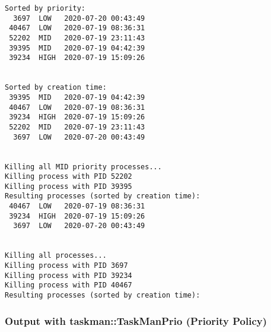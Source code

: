 \documentclass[a4paper]{scrartcl}
\begin{document}
\begin{verbatim}
Sorted by priority:
  3697  LOW   2020-07-20 00:43:49
 40467  LOW   2020-07-19 08:36:31
 52202  MID   2020-07-19 23:11:43
 39395  MID   2020-07-19 04:42:39
 39234  HIGH  2020-07-19 15:09:26


Sorted by creation time:
 39395  MID   2020-07-19 04:42:39
 40467  LOW   2020-07-19 08:36:31
 39234  HIGH  2020-07-19 15:09:26
 52202  MID   2020-07-19 23:11:43
  3697  LOW   2020-07-20 00:43:49


Killing all MID priority processes...
Killing process with PID 52202
Killing process with PID 39395
Resulting processes (sorted by creation time):
 40467  LOW   2020-07-19 08:36:31
 39234  HIGH  2020-07-19 15:09:26
  3697  LOW   2020-07-20 00:43:49


Killing all processes...
Killing process with PID 3697
Killing process with PID 39234
Killing process with PID 40467
Resulting processes (sorted by creation time):
\end{verbatim}


\subsubsection{Output with taskman::TaskManPrio (Priority Policy)}
\end{document}
